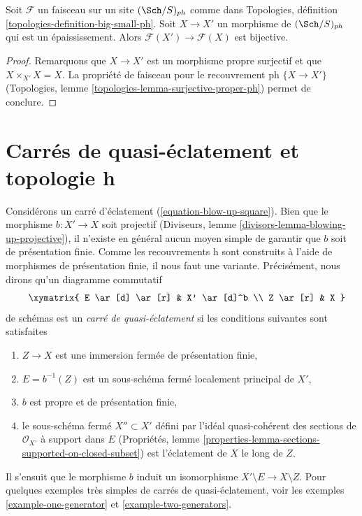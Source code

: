 \begin{lemma}
\label{lemma-thickening-ph}
Soit $\mathcal{F}$ un faisceau sur un site $(\Sch/S)_{ph}$
comme dans Topologies, définition \ref{topologies-definition-big-small-ph}.
Soit $X \to X'$ un morphisme de $(\Sch/S)_{ph}$ qui est
un épaississement. Alors
$\mathcal{F}(X') \to \mathcal{F}(X)$ est bijective.
\end{lemma}

\begin{proof}
Remarquons que $X \to X'$ est un morphisme propre surjectif et que
$X \times_{X'} X = X$.
La propriété de faisceau pour le recouvrement ph $\{X \to X'\}$
(Topologies, lemme
\ref{topologies-lemma-surjective-proper-ph})
permet de conclure.
\end{proof}








\section{Carrés de quasi-éclatement et topologie h}
\label{section-blow-up-h}

\noindent
Considérons un carré d'éclatement (\ref{equation-blow-up-square}).
Bien que le morphisme $b : X' \to X$
soit projectif (Diviseurs, lemme \ref{divisors-lemma-blowing-up-projective}),
il n'existe en général aucun moyen simple de garantir que
$b$ soit de présentation finie. Comme les recouvrements h sont construits
à l'aide de morphismes de présentation finie, il nous faut une variante.
Précisément, nous dirons qu'un diagramme commutatif
\begin{equation}
\label{equation-almost-blow-up-square}
\vcenter{
\xymatrix{
E \ar[d] \ar[r] & X' \ar[d]^b \\
Z \ar[r] & X
}
}
\end{equation}
de schémas est un {\it carré de quasi-éclatement} si les conditions suivantes
sont satisfaites
\begin{enumerate}
\item $Z \to X$ est une immersion fermée de présentation finie,
\item $E = b^{-1}(Z)$ est un sous-schéma fermé localement principal de $X'$,
\item $b$ est propre et de présentation finie,
\item le sous-schéma fermé $X'' \subset X'$ défini par l'idéal quasi-cohérent
des sections de $\mathcal{O}_{X'}$ à support dans $E$
(Propriétés, lemme \ref{properties-lemma-sections-supported-on-closed-subset})
est l'éclatement de $X$ le long de $Z$.
\end{enumerate}
Il s'ensuit que le morphisme $b$ induit un isomorphisme
$X' \setminus E \to X \setminus Z$.
Pour quelques exemples très simples de carrés de quasi-éclatement, voir les
exemples \ref{example-one-generator} et
\ref{example-two-generators}.

